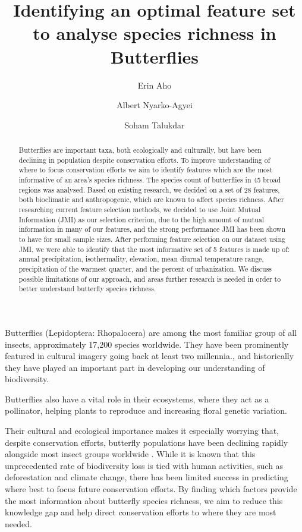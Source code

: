 \documentclass[prl,showpacs,superscriptaddress,twocolumn,longbibliography]{revtex4-1}
\begin{document}
\author{Erin Aho}
\author{Albert Nyarko-Agyei}
\author{Soham Talukdar}

\title{Identifying an optimal feature set to analyse species richness in Butterflies}


\begin{abstract}
Butterflies are important taxa, both ecologically and culturally, but have been declining in population despite conservation efforts. To improve understanding of where to focus conservation efforts we aim to identify features which are the most informative of an area's species richness.
The species count of butterflies in 45 broad regions was analysed. Based on existing research, we decided on a set of 28 features, both bioclimatic and anthropogenic, which are known to affect species richness. After researching current feature selection methods, we decided to use Joint Mutual Information (JMI) as our selection criterion, due to the high amount of mutual information in many of our features, and the strong performance JMI has been shown to have for small sample sizes. After performing feature selection on our dataset using JMI, we were able to identify that the most informative set of 5 features is made up of: annual precipitation, isothermality, elevation,  mean diurnal temperature range, precipitation of the warmest quarter, and the percent of urbanization. We discuss possible limitations of our approach, and areas further research is needed in order to better understand butterfly species richness.
\end{abstract}

\maketitle

Butterflies (Lepidoptera: Rhopalocera) are among the most familiar group of all insects, approximately 17,200 species worldwide\cite{shields_world_1989}. They have been prominently featured in cultural imagery going back at least two millennia.\cite{Dicke2000}, and historically they have played an important part in developing our understanding of biodiversity\cite{levin_butterflies_2001}. 

Butterflies also have a vital role in their ecosystems, where they act as a pollinator, helping plants to reproduce and increasing floral genetic variation\cite{ghazanfar_butterflies_2016}.

Their cultural and ecological importance makes it especially worrying that, despite conservation efforts, butterfly populations have been declining rapidly alongside most insect groups worldwide \cite{Wagner2021}. While it is known that this unprecedented rate of biodiversity loss is tied with human activities, such as deforestation and climate change\cite{white_human_2007, montgomery_is_2020, clark_effects_2007}, there has been limited success in predicting where best to focus future conservation efforts. By finding which factors provide the most information about butterfly species richness, we aim to reduce this knowledge gap and help direct conservation efforts to where they are most needed.
\end{document}
